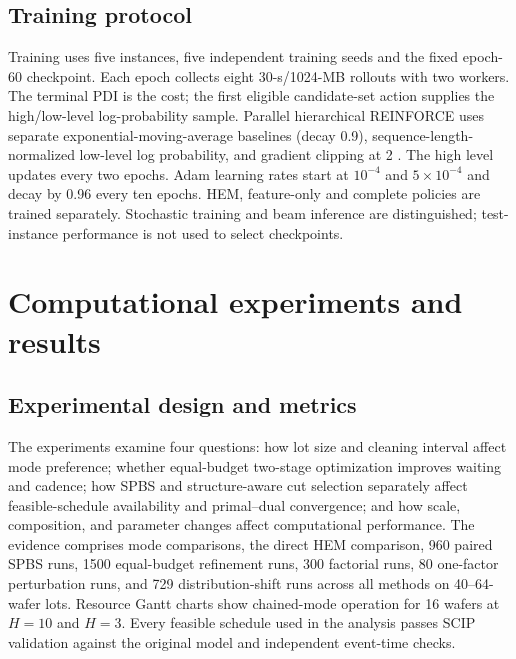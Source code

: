 \documentclass[journal]{IEEEtran}
\begin{document}
\subsection{Training protocol}
Training uses five instances, five independent training seeds and the fixed epoch-60 checkpoint. Each epoch collects eight 30-s/1024-MB rollouts with two workers. The terminal PDI is the cost; the first eligible candidate-set action supplies the high/low-level log-probability sample. Parallel hierarchical REINFORCE uses separate exponential-moving-average baselines (decay 0.9), sequence-length-normalized low-level log probability, and gradient clipping at 2 \cite{williams1992reinforce,mnih2016a3c}. The high level updates every two epochs. Adam learning rates start at $10^{-4}$ and $5\times10^{-4}$ and decay by 0.96 every ten epochs. HEM, feature-only and complete policies are trained separately. Stochastic training and beam inference are distinguished; test-instance performance is not used to select checkpoints.

\section{Computational experiments and results}
\label{sec:results-new}

\subsection{Experimental design and metrics}

The experiments examine four questions: how lot size and cleaning interval affect mode preference; whether equal-budget two-stage optimization improves waiting and cadence; how SPBS and structure-aware cut selection separately affect feasible-schedule availability and primal--dual convergence; and how scale, composition, and parameter changes affect computational performance. The evidence comprises mode comparisons, the direct HEM comparison, 960 paired SPBS runs, 1500 equal-budget refinement runs, 300 factorial runs, 80 one-factor perturbation runs, and 729 distribution-shift runs across all methods on 40--64-wafer lots. Resource Gantt charts show chained-mode operation for 16 wafers at $H=10$ and $H=3$. Every feasible schedule used in the analysis passes SCIP validation against the original model and independent event-time checks.
\end{document}
